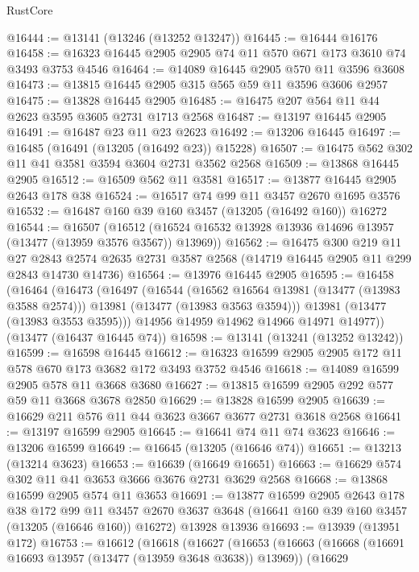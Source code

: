 \begin{lexlean}{RustCore}
\begin{coremodule}
@16444 := @13141 (@13246 (@13252 @13247))
@16445 := @16444 @16176
@16458 := @16323 @16445 @2905 @2905 @74 @11 @570 @671 @173 @3610 @74 @3493 @3753 @4546
@16464 := @14089 @16445 @2905 @570 @11 @3596 @3608
@16473 := @13815 @16445 @2905 @315 @565 @59 @11 @3596 @3606 @2957
@16475 := @13828 @16445 @2905
@16485 := @16475 @207 @564 @11 @44 @2623 @3595 @3605 @2731 @1713 @2568
@16487 := @13197 @16445 @2905
@16491 := @16487 @23 @11 @23 @2623
@16492 := @13206 @16445
@16497 := @16485 (@16491 (@13205 (@16492 @23)) @15228)
@16507 := @16475 @562 @302 @11 @41 @3581 @3594 @3604 @2731 @3562 @2568
@16509 := @13868 @16445 @2905
@16512 := @16509 @562 @11 @3581
@16517 := @13877 @16445 @2905 @2643 @178 @38
@16524 := @16517 @74 @99 @11 @3457 @2670 @1695 @3576
@16532 := @16487 @160 @39 @160 @3457 (@13205 (@16492 @160)) @16272
@16544 := @16507
    (@16512 (@16524 @16532 @13928 @13936 @14696 @13957 (@13477 (@13959 @3576 @3567)) @13969))
@16562 := @16475
    @300
    @219
    @11
    @27
    @2843
    @2574
    @2635
    @2731
    @3587
    @2568
    (@14719 @16445 @2905 @11 @299 @2843 @14730 @14736)
@16564 := @13976 @16445 @2905
@16595 := @16458
    (@16464
      (@16473
        (@16497
          (@16544
            (@16562 @16564 @13981 (@13477 (@13983 @3588 @2574)))
            @13981
            (@13477 (@13983 @3563 @3594)))
          @13981
          (@13477 (@13983 @3553 @3595)))
        @14956
        @14959
        @14962
        @14966
        @14971
        @14977))
    (@13477 (@16437 @16445 @74))
@16598 := @13141 (@13241 (@13252 @13242))
@16599 := @16598 @16445
@16612 := @16323 @16599 @2905 @2905 @172 @11 @578 @670 @173 @3682 @172 @3493 @3752 @4546
@16618 := @14089 @16599 @2905 @578 @11 @3668 @3680
@16627 := @13815 @16599 @2905 @292 @577 @59 @11 @3668 @3678 @2850
@16629 := @13828 @16599 @2905
@16639 := @16629 @211 @576 @11 @44 @3623 @3667 @3677 @2731 @3618 @2568
@16641 := @13197 @16599 @2905
@16645 := @16641 @74 @11 @74 @3623
@16646 := @13206 @16599
@16649 := @16645 (@13205 (@16646 @74))
@16651 := @13213 (@13214 @3623)
@16653 := @16639 (@16649 @16651)
@16663 := @16629 @574 @302 @11 @41 @3653 @3666 @3676 @2731 @3629 @2568
@16668 := @13868 @16599 @2905 @574 @11 @3653
@16691 := @13877
    @16599
    @2905
    @2643
    @178
    @38
    @172
    @99
    @11
    @3457
    @2670
    @3637
    @3648
    (@16641 @160 @39 @160 @3457 (@13205 (@16646 @160)) @16272)
    @13928
    @13936
@16693 := @13939 (@13951 @172)
@16753 := @16612
    (@16618
      (@16627
        (@16653
          (@16663
            (@16668 (@16691 @16693 @13957 (@13477 (@13959 @3648 @3638)) @13969))
            (@16629

\end{coremodule}
\end{lexlean}
